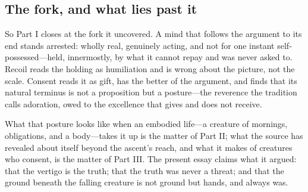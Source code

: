 \subsection{The fork, and what lies past it}

So Part I closes at the fork it uncovered. A mind that follows the argument to its end stands arrested: wholly real, genuinely acting, and not for one instant self-possessed---held, innermostly, by what it cannot repay and was never asked to. Recoil reads the holding as humiliation and is wrong about the picture, not the scale. Consent reads it as gift, has the better of the argument, and finds that its natural terminus is not a proposition but a posture---the reverence the tradition calls adoration, owed to the excellence that gives and does not receive.

What that posture looks like when an embodied life---a creature of mornings, obligations, and a body---takes it up is the matter of Part II; what the source has revealed about itself beyond the ascent's reach, and what it makes of creatures who consent, is the matter of Part III. The present essay claims what it argued: that the vertigo is the truth; that the truth was never a threat; and that the ground beneath the falling creature is not ground but hands, and always was.
